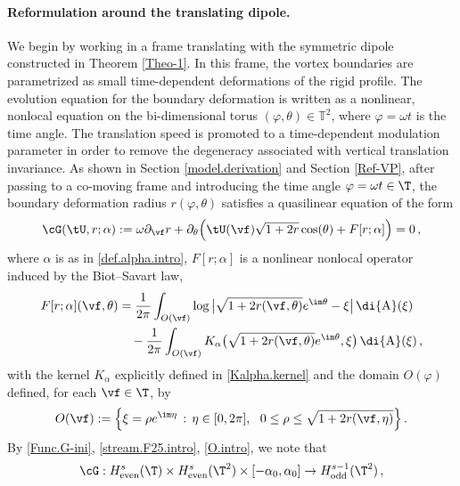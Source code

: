 \documentclass[a4paper,reqno,10pt]{article}
\newcommand{\pa}{\partial}
\newcommand{\wrta}{\,\di {\rm A}}
\begin{document}
\paragraph{Reformulation around the translating dipole.}
We begin by working in a frame translating with the symmetric dipole constructed in 
Theorem \ref{Theo-1}. In this frame, the vortex boundaries are parametrized as small time-dependent 
deformations of the rigid profile. The evolution equation for the boundary deformation 
is written as a nonlinear, nonlocal equation on the bi-dimensional torus $(\varphi,\theta)\in\mathbb{T}^2$, 
where $\varphi=\omega t$ is the time angle. The translation speed is promoted to a 
time-dependent modulation parameter in order to remove the degeneracy associated with 
vertical translation invariance.
As shown in Section \ref{model.derivation} and Section \ref{Ref-VP}, after passing to a co-moving frame and introducing the time angle 
$\varphi=\omega t \in \T$, the boundary deformation radius $r(\varphi,\theta)$ satisfies a 
quasilinear equation of the form
\begin{align}\label{Func.G-ini}
		\cG(\tU,r;\alpha):= \omega \pa_{\vf} r + \pa_{\theta} \Big( \tU(\vf) \sqrt{1+2 r} \cos(\theta) + F[r;\alpha] \Big)=0 \,, 
         \end{align}
       where $\alpha$ is as in \eqref{def.alpha.intro}, $F[r;\alpha]$ is a nonlinear nonlocal operator induced by the 
Biot–Savart law,
         \begin{align}
         \label{stream.F25.intro}
		\nonumber F[r;\alpha](\vf,\theta) 
		& =   \frac{1}{2\pi} \int_{O(\vf)} \log \big|  \sqrt{1+2r(\vf,\theta)}e^{\im\theta} -\xi \big| \wrta(\xi) 
		\\
		& \quad - \frac{1}{2\pi} \int_{O(\vf)} K_\alpha\big(\sqrt{1+2 r(\vf,\theta)}e^{\im\theta},\xi\big) \wrta(\xi) \,,
	  \end{align}
      with the kernel $K_{\alpha}$ explicitly defined in \eqref{Kalpha.kernel} and 
     the domain $O(\varphi)$  defined, for each $\vf\in\T$, by
      \begin{equation}\label{O.intro}
 	O(\vf):= \Big\{ \xi = \rho e^{\im\eta} \,:\, \eta\in[0,2\pi], \ \  0\leq \rho  \leq \sqrt{1+2r(\vf,\eta)} \Big\}\,.
 \end{equation}
By \eqref{Func.G-ini}, \eqref{stream.F25.intro}, \eqref{O.intro}, we note that
 \begin{equation}
     \cG : H_{\rm even}^s(\T) \times H_{\rm even}^s(\T^2) \times [-\alpha_0,\alpha_0] \to H_{\rm odd}^{s-1}(\T^2) \,,
 \end{equation}
\end{document}
